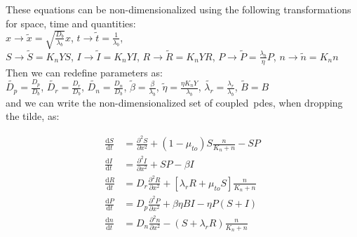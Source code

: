 These equations can be non-dimensionalized using the following transformations for space, time and quantities:\\
$x \rightarrow \tilde{x} = \sqrt{\frac{D_b}{\lambda_b}} x$, $t \rightarrow \tilde{t} = \frac{1}{\lambda_b}$, \\
$S \rightarrow \tilde{S} = K_n Y S$, $I \rightarrow \tilde{I} = K_n Y I$, $R \rightarrow \tilde{R} = K_n Y R$, $P \rightarrow \tilde{P} = \frac{\lambda_b}{\eta} P$, $n \rightarrow \tilde{n} = K_n n$\\
Then we can redefine parameters as:\\
$\tilde{D_p} = \frac{D_p}{D_b}$, $\tilde{D_r} = \frac{D_r}{D_b}$, $\tilde{D_n} = \frac{D_n}{D_b}$, $\tilde{\beta} = \frac{\beta}{\lambda_b}$, $\tilde{\eta} = \frac{\eta K_n Y}{\lambda_b}$, $\tilde{\lambda_r} = \frac{\lambda_r}{\lambda_b}$, $\tilde{B} = B$\\
and we can write the non-dimensionalized set of coupled~\gls{pde}s, when dropping the tilde, as:
    
\begin{align}
    \frac{\text{d}S}{\text{d}t} &= \frac{\partial^2S}{\partial x^2} + \left( 1 - \mu_{to} \right) S \frac{n}{K_n+n}  - SP \\
    \frac{\text{d}I}{\text{d}t} &= \frac{\partial^2I}{\partial x^2} + SP - \beta I\\
    \frac{\text{d}R}{\text{d}t} &= D_r \frac{\partial^2R}{\partial x^2} + \left[\lambda_r R + \mu_{to} S \right] \frac{n}{K_n+n}\\
    \frac{\text{d}P}{\text{d}t} &= D_p \frac{\partial^2P}{\partial x^2} + \beta \eta BI - \eta P(S+I) \\
    \frac{\text{d}n}{\text{d}t} &= D_n \frac{\partial^2n}{\partial x^2} - \left( S + \lambda_r R \right) \frac{n}{K_n+n}
\end{align}


